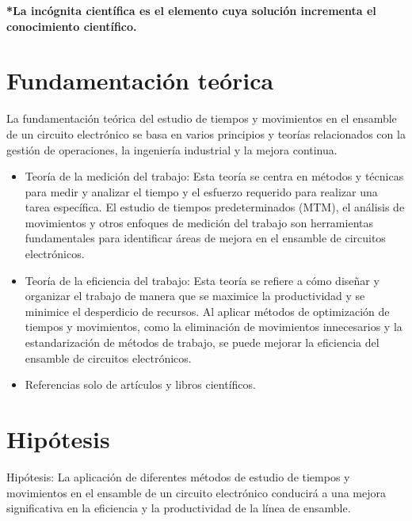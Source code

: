     \textbf{*La incógnita científica es el elemento cuya solución incrementa el conocimiento científico.}
    \section{Fundamentación teórica}
    
    La fundamentación teórica del estudio de tiempos y movimientos en el ensamble de un circuito electrónico se basa en varios principios y teorías relacionados con la gestión de operaciones, la ingeniería industrial y la mejora continua.
    
    \begin{itemize}
        \item Teoría de la medición del trabajo: Esta teoría se centra en métodos y técnicas para medir y analizar el tiempo y el esfuerzo requerido para realizar una tarea específica. El estudio de tiempos predeterminados (MTM), el análisis de movimientos y otros enfoques de medición del trabajo son herramientas fundamentales para identificar áreas de mejora en el ensamble de circuitos electrónicos.
        \item Teoría de la eficiencia del trabajo: Esta teoría se refiere a cómo diseñar y organizar el trabajo de manera que se maximice la productividad y se minimice el desperdicio de recursos. Al aplicar métodos de optimización de tiempos y movimientos, como la eliminación de movimientos innecesarios y la estandarización de métodos de trabajo, se puede mejorar la eficiencia del ensamble de circuitos electrónicos.
        \item Referencias solo de artículos y libros científicos.
    \end{itemize}
    \section{Hipótesis}
    
    Hipótesis: La aplicación de diferentes métodos de estudio de tiempos y movimientos en el ensamble de un circuito electrónico conducirá a una mejora significativa en la eficiencia y la productividad de la línea de ensamble.
    
